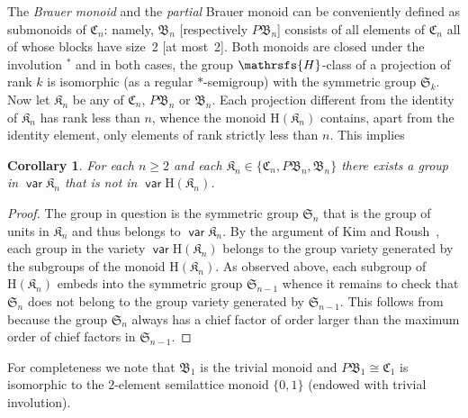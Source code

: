 \documentclass[11pt,reqno]{amsart}
\DeclareMathOperator{\var}{\mathsf{var}}
\numberwithin{equation}{section}
\newtheorem{Cor}[Thm]{Corollary}
\theoremstyle{remark}
\def\Hc{\mathrsfs{H}}
\def\H{\mathrm H}
\def\C{\mathfrak{C}}
\def\B{\mathfrak{B}}
\def\Sim{\mathfrak{S}}
\begin{document}
The \emph{Brauer monoid} and the \emph{partial} Brauer monoid can
be conveniently defined as submonoids of $\C_n$: namely, $\B_n$
[respectively $P\B_n$] consists of all elements of $\C_n$ all of
whose blocks have size~2 [at most~2]. Both monoids are closed
under the involution $^*$ and in both cases, the group $\Hc$-class
of a projection of rank $k$ is isomorphic (as a regular
$*$-semigroup) with the symmetric group $\Sim_k$. Now let
$\mathfrak{K}_n$ be any of $\C_n$, $P\B_n$ or $\B_n$. Each
projection different from the identity of $\mathfrak{K}_n$ has
rank less than $n$, whence the monoid $\H(\mathfrak{K}_n)$
contains, apart from the identity element, only elements of rank
strictly less than $n$. This implies

\begin{Cor}
\label{groups in the gap} For each $n\ge 2$ and each
$\mathfrak{K}_n\in \{\C_n,P\B_n,\B_n\}$ there exists a group in
$\var\mathfrak{K}_n$ that is not in $\var\H(\mathfrak{K}_n)$.
\end{Cor}
\begin{proof}
The group in question is the symmetric group $\Sim_n$ that is the
group of units in $\mathfrak{K}_n$ and thus belongs to
$\var\mathfrak{K}_n$. By the argument of Kim and Roush~\cite{KR},
each group in the variety $\var\H(\mathfrak{K}_n)$ belongs to the
group variety generated by the subgroups of the monoid
$\H(\mathfrak{K}_n)$. As observed above, each subgroup of
$\H(\mathfrak{K}_n)$ embeds into the symmetric group $\Sim_{n-1}$
whence it remains to check that $\Sim_n$ does not belong to the
group variety generated by $\Sim_{n-1}$. This follows from
\cite[Theorem 51.2]{Ne} because the group $\Sim_n$ always has a
chief factor of order larger than the maximum order of chief
factors in $\Sim_{n-1}$.
\end{proof}

For completeness we note that $\B_1$ is the trivial monoid and
$P\B_1\cong \C_1$ is isomorphic to the $2$-element semilattice
monoid $\{0,1\}$ (endowed with trivial involution).
\end{document}
